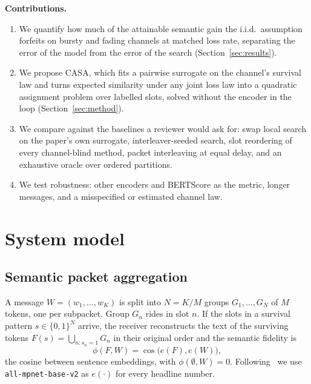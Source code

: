 \documentclass[journal,onecolumn,11pt,draftclsnofoot]{IEEEtran}
\begin{document}
\textbf{Contributions.}
\begin{enumerate}
\item We quantify how much of the attainable semantic gain the i.i.d.\ assumption forfeits on bursty and fading channels at matched loss rate, separating the error of the model from the error of the search (Section~\ref{sec:results}).
\item We propose CASA, which fits a pairwise surrogate on the channel's survival law and turns expected similarity under any joint loss law into a quadratic assignment problem over labelled slots, solved without the encoder in the loop (Section~\ref{sec:method}).
\item We compare against the baselines a reviewer would ask for: swap local search on the paper's own surrogate, interleaver-seeded search, slot reordering of every channel-blind method, packet interleaving at equal delay, and an exhaustive oracle over ordered partitions.
\item We test robustness: other encoders and BERTScore as the metric, longer messages, and a misspecified or estimated channel law.
\end{enumerate}

\section{System model}

\subsection{Semantic packet aggregation}
A message $W=(w_1,\dots,w_K)$ is split into $N=K/M$ groups $G_1,\dots,G_N$ of $M$ tokens, one per subpacket. Group $G_n$ rides in slot $n$. If the slots in a survival pattern $s\in\{0,1\}^N$ arrive, the receiver reconstructs the text of the surviving tokens $F(s)=\bigcup_{n:s_n=1} G_n$ in their original order and the semantic fidelity is
\begin{equation}
\phi(F,W)=\cos\big(e(F),e(W)\big),
\end{equation}
the cosine between sentence embeddings, with $\phi(\emptyset,W)=0$. Following~\cite{lee2026look} we use \texttt{all-mpnet-base-v2} as $e(\cdot)$ for every headline number.
\end{document}
